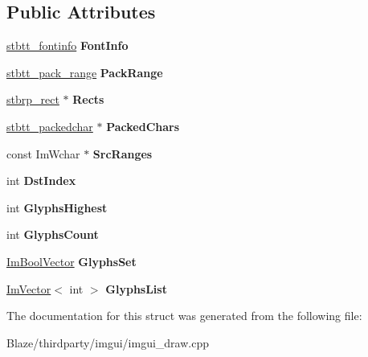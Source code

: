 \subsection*{Public Attributes}
\begin{DoxyCompactItemize}
\item 
\mbox{\label{structImFontBuildSrcData_aa7499553235c2f084be3d2e2e030c3cc}} 
\hyperlink{structstbtt__fontinfo}{stbtt\+\_\+fontinfo} {\bfseries Font\+Info}
\item 
\mbox{\label{structImFontBuildSrcData_a98c6b58804c9be957ea6ce5b1732ad52}} 
\hyperlink{structstbtt__pack__range}{stbtt\+\_\+pack\+\_\+range} {\bfseries Pack\+Range}
\item 
\mbox{\label{structImFontBuildSrcData_a918baffa45001ec6ba866ad18a338969}} 
\hyperlink{structstbrp__rect}{stbrp\+\_\+rect} $\ast$ {\bfseries Rects}
\item 
\mbox{\label{structImFontBuildSrcData_a7c85b2866a23a42357f19c05df2b7f3f}} 
\hyperlink{structstbtt__packedchar}{stbtt\+\_\+packedchar} $\ast$ {\bfseries Packed\+Chars}
\item 
\mbox{\label{structImFontBuildSrcData_a30187b934b16d7bef600887f1cc6614f}} 
const Im\+Wchar $\ast$ {\bfseries Src\+Ranges}
\item 
\mbox{\label{structImFontBuildSrcData_a1fa5c70e2d29e53743557d55050ab912}} 
int {\bfseries Dst\+Index}
\item 
\mbox{\label{structImFontBuildSrcData_a40ce6c1a652c3d3c67d094e064691da1}} 
int {\bfseries Glyphs\+Highest}
\item 
\mbox{\label{structImFontBuildSrcData_a73600dcc4e6c8d6b499c032c4ed0e823}} 
int {\bfseries Glyphs\+Count}
\item 
\mbox{\label{structImFontBuildSrcData_a7edd0193194ca109bfa5042369861935}} 
\hyperlink{structImBoolVector}{Im\+Bool\+Vector} {\bfseries Glyphs\+Set}
\item 
\mbox{\label{structImFontBuildSrcData_ae4d653fb221fc19a30a2117f73043377}} 
\hyperlink{structImVector}{Im\+Vector}$<$ int $>$ {\bfseries Glyphs\+List}
\end{DoxyCompactItemize}


The documentation for this struct was generated from the following file\+:\begin{DoxyCompactItemize}
\item 
Blaze/thirdparty/imgui/imgui\+\_\+draw.\+cpp\end{DoxyCompactItemize}
